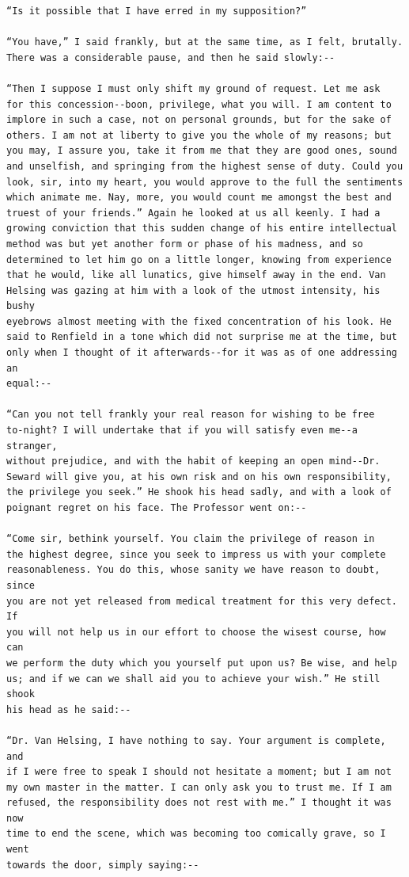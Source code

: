 \documentclass{article}
\begin{document}
\begin{verbatim}
“Is it possible that I have erred in my supposition?”

“You have,” I said frankly, but at the same time, as I felt, brutally.
There was a considerable pause, and then he said slowly:--

“Then I suppose I must only shift my ground of request. Let me ask
for this concession--boon, privilege, what you will. I am content to
implore in such a case, not on personal grounds, but for the sake of
others. I am not at liberty to give you the whole of my reasons; but
you may, I assure you, take it from me that they are good ones, sound
and unselfish, and springing from the highest sense of duty. Could you
look, sir, into my heart, you would approve to the full the sentiments
which animate me. Nay, more, you would count me amongst the best and
truest of your friends.” Again he looked at us all keenly. I had a
growing conviction that this sudden change of his entire intellectual
method was but yet another form or phase of his madness, and so
determined to let him go on a little longer, knowing from experience
that he would, like all lunatics, give himself away in the end. Van
Helsing was gazing at him with a look of the utmost intensity, his bushy
eyebrows almost meeting with the fixed concentration of his look. He
said to Renfield in a tone which did not surprise me at the time, but
only when I thought of it afterwards--for it was as of one addressing an
equal:--

“Can you not tell frankly your real reason for wishing to be free
to-night? I will undertake that if you will satisfy even me--a stranger,
without prejudice, and with the habit of keeping an open mind--Dr.
Seward will give you, at his own risk and on his own responsibility,
the privilege you seek.” He shook his head sadly, and with a look of
poignant regret on his face. The Professor went on:--

“Come sir, bethink yourself. You claim the privilege of reason in
the highest degree, since you seek to impress us with your complete
reasonableness. You do this, whose sanity we have reason to doubt, since
you are not yet released from medical treatment for this very defect. If
you will not help us in our effort to choose the wisest course, how can
we perform the duty which you yourself put upon us? Be wise, and help
us; and if we can we shall aid you to achieve your wish.” He still shook
his head as he said:--

“Dr. Van Helsing, I have nothing to say. Your argument is complete, and
if I were free to speak I should not hesitate a moment; but I am not
my own master in the matter. I can only ask you to trust me. If I am
refused, the responsibility does not rest with me.” I thought it was now
time to end the scene, which was becoming too comically grave, so I went
towards the door, simply saying:--


\end{verbatim}
\end{document}
